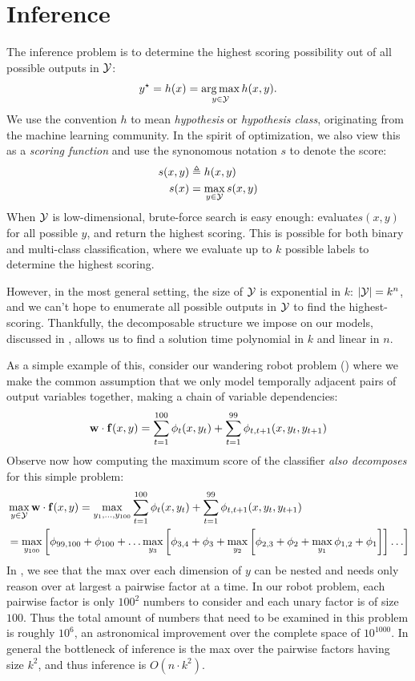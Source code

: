 \section{Inference}
\label{sec:inference}
The inference problem is to determine the highest scoring possibility out of 
all possible outputs in $\mathcal{Y}$: 
\begin{equation} 
y^\star = h(x) = \mathop{\arg\max}_{y \in \mathcal{Y}} h(x,y).  
\end{equation}
We use the convention $h$ to mean {\em hypothesis} or {\em hypothesis class}, originating from the machine learning community.  In the spirit of optimization, we also view this as a {\em scoring function} and use the synonomous notation $s$ to denote the score:
\begin{align} 
s(x,y) &\triangleq h(x,y) \\
s(x) &= \max_{y \in \mathcal{Y}} s(x,y)
\end{align}
When $\mathcal{Y}$ is low-dimensional, brute-force search is easy enough: 
evaluate$s(x,y)$ for all possible $y$, and return the highest scoring.  This is 
possible for both binary and multi-class classification, where we evaluate up 
to $k$ possible labels to determine the highest scoring.

However, in the most general setting, the size of $\mathcal{Y}$ is exponential in $k$: 
$|\mathcal{Y}| = k^n$, and we can't hope to enumerate all possible outputs in $\mathcal{Y}$ to 
find the highest-scoring.  Thankfully, the decomposable structure we impose on 
our models, discussed in , allows us to find a solution time 
polynomial in $k$ and linear in $n$.
 

As a simple example of this, consider our wandering robot problem 
() where we make the common assumption that we only model 
temporally adjacent pairs of output variables together, making a chain of 
variable dependencies:
\begin{equation*}
\mathbf{w} \cdot \mathbf{f}(x,y) = \sum_{t=1}^{100} \phi_t(x,y_t) + \sum_{t=1}^{99} 
\phi_{t,t+1}(x,y_t,y_{t+1})
\end{equation*}
Observe now how computing the maximum score of the classifier {\em also 
decomposes} for this simple problem:
\begin{align}
&\max_{y \in \mathcal{Y}} \mathbf{w} \cdot \mathbf{f}(x,y) = \max_{y_1,\ldots,y_{100}} 
\sum_{t=1}^{100} \phi_t(x,y_t) + \sum_{t=1}^{99} \phi_{t,t+1}(x,y_t,y_{t+1}) \\
&= \max_{y_{100}} \left[ \phi_{99,100} + \phi_{100} + \ldots \max_{y_3} \left[\phi_{3,4} + \phi_3 +  \max_{y_2} \left[ \phi_{2,3} + \phi_2 + \max_{y_1} \phi_{1,2} + \phi_1 \right] \right] \ldots \right] 
\label{eq:nesting} \end{align} 
In , we see that the max over each dimension of $y$ can be
nested and needs only reason over at largest a pairwise factor at a time.  In 
our robot problem, each pairwise factor is only $100^2$ numbers to consider and 
each unary factor is of size $100$. Thus the total amount of numbers that need 
to be examined in this problem is roughly $10^6$, an astronomical improvement 
over the complete space of $10^{1000}$. In general the bottleneck of inference 
is the max over the pairwise factors having size $k^2$, and thus inference is 
$O(n \cdot k^2)$.

